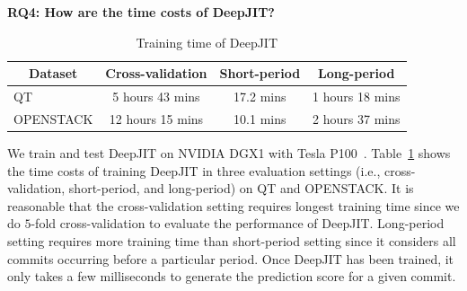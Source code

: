 \noindent \textbf{RQ4: How are the time costs of DeepJIT?}

\begin{table}[t!]
  \centering
  \caption{Training time of DeepJIT}
    \begin{tabular}{|l|c|c|c|}
    \hline
    \multicolumn{1}{|c|}{Dataset} & \textbf{Cross-validation} & \textbf{Short-period} & \textbf{Long-period} \\
    \hline
    \hline
    QT    & 5 hours 43 mins & 17.2 mins & 1 hours 18 mins \\
    \hline
    OPENSTACK & 12 hours 15 mins & 10.1 mins & 2 hours 37 mins \\
    \hline
    \end{tabular}%
  \label{tab:cost}%
\end{table}%

We train and test DeepJIT on NVIDIA DGX1 with Tesla P100~\cite{gawande2018scaling}. Table~\ref{tab:cost} shows the time costs of training DeepJIT in three evaluation settings (i.e., cross-validation, short-period, and long-period) on QT and OPENSTACK. It is reasonable that the cross-validation setting requires longest training time since we do $5$-fold cross-validation to evaluate the performance of DeepJIT. Long-period setting requires more training time than short-period setting since it considers all commits occurring before a particular period. Once DeepJIT has been trained, it only takes a few milliseconds to generate the prediction score for a given commit.

